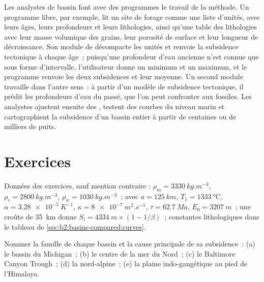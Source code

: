 \begin{inthelab}
Les analystes de bassin font avec des programmes le travail de la méthode. Un programme libre, par exemple, lit
un site de forage comme une liste d'unités, avec leurs âges, leurs profondeurs et leurs lithologies, ainsi qu'une table
des lithologies avec leur masse volumique des grains, leur porosité de surface et leur longueur de décroissance. Son
module de  décompacte les unités et renvoie la subsidence tectonique à chaque âge~;
puisqu'une profondeur d'eau ancienne n'est connue que sous forme d'intervalle, l'utilisateur donne un minimum et un maximum, et
le programme renvoie les deux subsidences et leur moyenne. Un second module travaille dans l'autre sens~:
à partir d'un modèle de subsidence tectonique, il prédit les profondeurs d'eau du passé, que l'on peut
confronter aux fossiles. Les analystes ajustent ensuite des , testent des courbes du niveau marin et
cartographient la subsidence d'un bassin entier à partir de centaines ou de milliers de puits.
\end{inthelab}

\section*{Exercices}\label{sec:b2:basins-compared:exercises}

Données des exercices, sauf mention contraire : $\rho_m = \qty{3330}{kg.m^{-3}}$, $\rho_c =
\qty{2800}{kg.m^{-3}}$, $\rho_w = \qty{1030}{kg.m^{-3}}$~;  avec $a =
\qty{125}{km}$, $T_1 = \qty{1333}{\celsius}$, $\alpha = \qty{3.28e-5}{K^{-1}}$, $\kappa =
\qty{8e-7}{m^2.s^{-1}}$, $\tau = \qty{62.7}{Ma}$, $E_0 = \qty{3207}{m}$~; une croûte de \qty{35}{km}
donne $S_i = \qty{4334}{m}\times(1 - 1/\beta)$~; constantes lithologiques dans le tableau de
\cref{sec:b2:basins-compared:curves}.

\begin{exercise}[$\star$]\label{exo:b2:basins-compared:1}
Nommer la famille de chaque bassin et la cause principale de sa subsidence~: (a) le bassin du Michigan~;
(b) le centre de la mer du Nord~; (c) le Baltimore Canyon Trough~; (d) la  nord-alpine~;
(e) la plaine indo-gangétique au pied de l'Himalaya.
\end{exercise}

